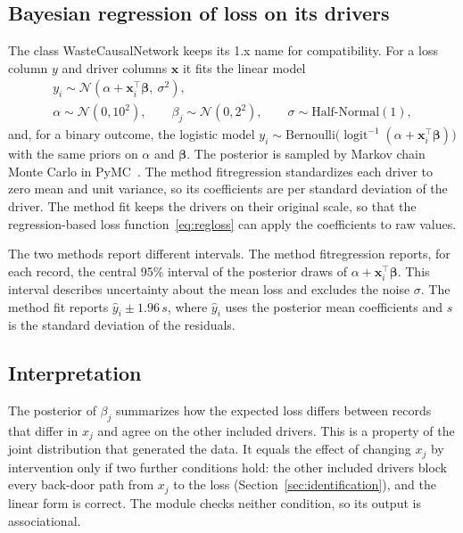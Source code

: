 \documentclass[12pt]{article}
\DeclareMathOperator{\logit}{logit}
\newcommand{\expit}{\logit^{-1}}
\newcommand{\code}[1]{{\ttfamily\def\_{\textunderscore\allowbreak}#1}}
\theoremstyle{plain}
\theoremstyle{definition}
\begin{document}
\subsection{Bayesian regression of loss on its drivers}\label{sec:regression}

The class \code{WasteCausalNetwork} keeps its 1.x name for compatibility. For a loss column $y$ and driver columns $\mathbf{x}$ it fits the linear model
\begin{gather*}
    y_i \sim \mathcal{N}(\alpha+\mathbf{x}_i^{\top}\boldsymbol\beta,\ \sigma^2),\\
    \alpha \sim \mathcal{N}(0,10^2),\qquad
    \beta_j \sim \mathcal{N}(0,2^2),\qquad
    \sigma \sim \text{Half-Normal}(1),
\end{gather*}
and, for a binary outcome, the logistic model $y_i\sim\text{Bernoulli}\bigl(\expit(\alpha+\mathbf{x}_i^{\top}\boldsymbol\beta)\bigr)$ with the same priors on $\alpha$ and $\boldsymbol\beta$. The posterior is sampled by Markov chain Monte Carlo in PyMC~\cite{pymc}. The method \code{fit\_regression} standardizes each driver to zero mean and unit variance, so its coefficients are per standard deviation of the driver. The method \code{fit} keeps the drivers on their original scale, so that the regression-based loss function~\eqref{eq:regloss} can apply the coefficients to raw values.

The two methods report different intervals. The method \code{fit\_regression} reports, for each record, the central 95\% interval of the posterior draws of $\alpha+\mathbf{x}_i^{\top}\boldsymbol\beta$. This interval describes uncertainty about the mean loss and excludes the noise $\sigma$. The method \code{fit} reports $\hat y_i\pm 1.96\,s$, where $\hat y_i$ uses the posterior mean coefficients and $s$ is the standard deviation of the residuals.

\subsection{Interpretation}\label{sec:assoc}

The posterior of $\beta_j$ summarizes how the expected loss differs between records that differ in $x_j$ and agree on the other included drivers. This is a property of the joint distribution that generated the data. It equals the effect of changing $x_j$ by intervention only if two further conditions hold: the other included drivers block every back-door path from $x_j$ to the loss (Section~\ref{sec:identification}), and the linear form is correct. The module checks neither condition, so its output is associational.
\end{document}
